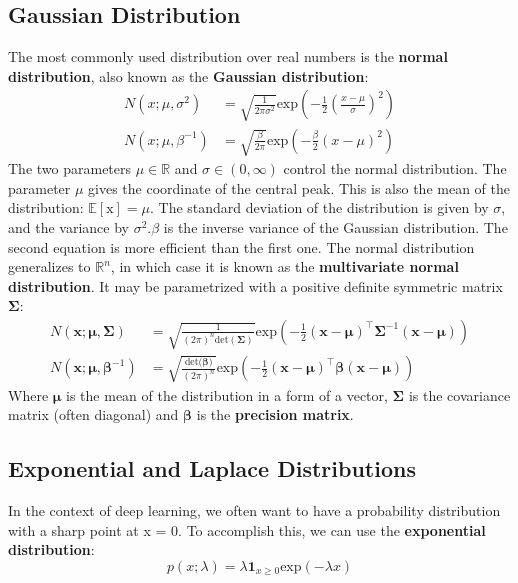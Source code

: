 \documentclass[12pt]{report}
\begin{document}
        \subsection{Gaussian Distribution}
            The most commonly used distribution over real numbers is the \textbf{normal distribution}, also known as the \textbf{Gaussian distribution}:
            \begin{align}
                N(x; \mu, \sigma^2) &= \sqrt{\frac{1}{2\pi\sigma^2}}\text{exp}\left(-\frac{1}{2}\left(\frac{x - \mu}{\sigma}\right)^2\right) \\
                N(x; \mu, \beta^{-1}) &= \sqrt{\frac{\beta}{2\pi}}\text{exp}\left(-\frac{\beta}{2}\left(x - \mu\right)^2\right)
            \end{align}
            The two parameters $\mu \in \mathbb{R}$ and $\sigma \in (0, \infty)$ control the normal distribution. The parameter $\mu$ gives the coordinate of the central peak. This is also the mean of the distribution: $\mathbb{E}[\text{x}] = \mu$. The standard deviation of the distribution is given by $\sigma$, and the variance by $\sigma^2$.$\beta$ is the inverse variance of the Gaussian distribution.
            The second equation is more efficient than the first one. The normal distribution generalizes to $\mathbb{R}^n$, in which case it is known as the \textbf{multivariate normal distribution}. It may be parametrized with a positive definite symmetric matrix $\boldsymbol{\Sigma}$:
            \begin{align}
                N(\boldsymbol{x}; \boldsymbol{\mu}, \boldsymbol{\Sigma}) &= \sqrt{\frac{1}{(2\pi)^n \text{det}(\boldsymbol{\Sigma})}}\text{exp}\left(-\frac{1}{2}(\boldsymbol{x} - \boldsymbol{\mu})^\top \boldsymbol{\Sigma}^{-1}(\boldsymbol{x} - \boldsymbol{\mu})\right) \\
                N\left(\boldsymbol{x}; \boldsymbol{\mu}, \boldsymbol{\beta}^{-1}\right) &= \sqrt{\frac{\text{det}(\boldsymbol{\beta)}}{(2\pi)^n }}\text{exp}\left(-\frac{1}{2}(\boldsymbol{x} - \boldsymbol{\mu})^\top \boldsymbol{\beta}(\boldsymbol{x} - \boldsymbol{\mu})\right)
            \end{align}
            Where $\boldsymbol{\mu}$ is the mean of the distribution in a form of a vector, $\boldsymbol{\Sigma}$ is the covariance matrix (often diagonal) and $\boldsymbol{\beta}$ is the \textbf{precision matrix}.
            
        \subsection{Exponential and Laplace Distributions}
            In the context of deep learning, we often want to have a probability distribution with a sharp point at x = 0. To accomplish this, we can use the \textbf{exponential distribution}:
            \begin{equation}
                p(x;\lambda) = \lambda\boldsymbol{1}_{x \geq 0}\text{exp}\left(-\lambda x \right)
            \end{equation}
\end{document}
